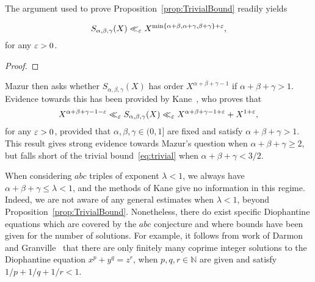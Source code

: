 The argument used to prove Proposition~\ref{prop:TrivialBound} readily yields

\begin{lemma}\label{lem:TrivialBdforS}
\begin{equation}\label{eq:trivial}
 S_{\alpha,\beta,\gamma}(X)\ll_\varepsilon X^{\min\{\alpha+\beta , \alpha+\gamma , \beta+\gamma\}+\varepsilon},
\end{equation}
for any $\varepsilon>0$.
\end{lemma}
\begin{proof}
\end{proof}


Mazur then asks whether
 $S_{\alpha,\beta,\gamma}(X)$ has order $X^{\alpha+\beta+\gamma-1}$
if $\alpha+\beta+\gamma>1$.
Evidence towards this has been provided by Kane~\cite[Theorems~1 and 2]{kane}, who proves that
\[
X^{\alpha+\beta+\gamma-1-\varepsilon}\ll_\varepsilon
S_{\alpha,\beta,\gamma}(X)\ll_\varepsilon
X^{\alpha+\beta+\gamma-1+\varepsilon}+X^{1+\varepsilon},
\]
for any $\varepsilon>0$,
provided that $\alpha,\beta,\gamma\in (0,1]$ are fixed and satisfy $\alpha+\beta+\gamma>1$.
This result gives strong evidence towards Mazur's question when
$\alpha+\beta+\gamma\geq 2$, but falls short of the trivial bound~\eqref{eq:trivial}
when $\alpha+\beta+\gamma<3/2$.


When considering $abc$ triples of exponent $\lambda<1$, we always have $\alpha+\beta+\gamma\leq \lambda< 1$, and the methods of Kane give no information
in this regime. Indeed, we are not aware of any general estimates when $\lambda<1$,
 beyond Proposition~\ref{prop:TrivialBound}. Nonetheless, there do exist specific Diophantine equations which are covered by the $abc$ conjecture and where bounds have been given for the number of solutions.
For example, it follows from work of Darmon and
Granville~\cite{DG} that there are only finitely many coprime integer solutions to the Diophantine equation $x^p+y^q=z^r$, when $p,q,r\in \mathbb{N}$ are given and satisfy $1/p+1/q+1/r<1$.


